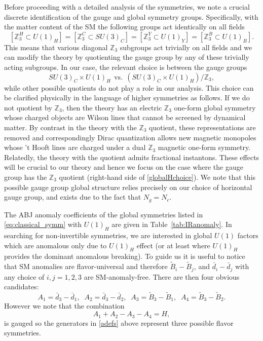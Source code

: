\documentclass[11pt,a4paper]{article}
\def\beq{\begin{equation}}
\def\eeq{\end{equation}}
\begin{document}
Before proceeding with a detailed analysis of the symmetries, we note a crucial discrete identification of the gauge and global symmetry groups.  Specifically, with the matter content of the SM the following groups act identically on all fields  
\beq 
\left[ \mathbb{Z}_3^{H} \subset U(1)_H \right] = \left[ \mathbb{Z}_3^{C} \subset SU(3)_C \right] = \left[ \mathbb{Z}_3^{Y} \subset U(1)_Y \right] = \left[ \mathbb{Z}_3^{B} \subset U(1)_B \right].
\label{eq:Z_3_equivalence}
\eeq 
This means that various diagonal $\mathbb{Z}_{3}$ subgroups act trivially on all fields and we can modify the theory by quotienting the gauge group by any of these trivially acting subgroups. In our case, the relevant choice is between the gauge groups
\begin{equation}\label{globalHchoice}
    SU(3)_{C}\times U(1)_{H} ~~\text{vs.}~~\left(SU(3)_{C}\times U(1)_{H}\right)/\mathbb{Z}_{3},
\end{equation}
while other possible quotients do not play a role in our analysis.  This choice can be clarified physically in the language of higher symmetries as follows.  If we do not quotient by $\mathbb{Z}_{3}$, then the theory has an electric $\mathbb{Z}_{3}$ one-form global symmetry whose charged objects are Wilson lines that cannot be screened by dynamical matter.  By contrast in the theory with the $\mathbb{Z}_{3}$ quotient, these representations are removed and correspondingly Dirac quantization allows new magnetic monopoles whose 't Hooft lines are charged under a dual $\mathbb{Z}_{3}$ magnetic one-form symmetry.  Relatedly, the theory with the quotient admits fractional instantons. These effects will be crucial to our theory and hence we focus on the case where the gauge group has the $\mathbb{Z}_{3}$ quotient (right-hand side of \eqref{globalHchoice}).  We note that this possible gauge group global structure relies precisely on our choice of horizontal gauge group, and exists due to the fact that $N_{g}=N_{c}.$


The ABJ anomaly coefficients of the global symmetries listed in \eqref{eq:classical_symm} with $U(1)_H$ are given in Table~\ref{tab:IRanomaly}. In searching for non-invertible symmetries, we are interested in global $U(1)$ factors which are anomalous only due to $U(1)_H$ effect (or at least where $U(1)_H$ provides the dominant anomalous breaking). To guide us it is useful to notice that SM anomalies are flavor-universal and therefore $\tilde{B}_i - \tilde{B}_j$, and $\bar d_i - \bar d_j$ with any choice of $i,j=1,2,3$ are SM-anomaly-free. There are then four obvious candidates:
%
\beq \label{adefs}
A_1 = \bar{d}_3 - \bar{d}_1, \;\; A_2 = \bar{d}_3 - \bar{d}_2, \;\; A_3 = \tilde{B}_3- \tilde{B}_1, \;\; A_4 = \tilde{B}_3 - \tilde{B}_2.
\eeq 
However we note that the combination
\begin{equation}
    A_{1}+A_{2}-A_{3}-A_{4}=H,
\end{equation}
is gauged so the generators in \eqref{adefs} above represent three possible flavor symmetries.
\end{document}

